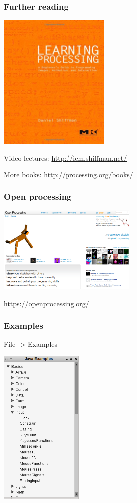 \documentclass[ignorenonframetext,]{beamer}
\begin{document}
\begin{frame}[fragile]\frametitle{Further reading}

\includegraphics[width=0.4\textwidth]{../images/learningprocessing.jpg}

Video lectures: \url{http://icm.shiffman.net/}

More books: \url{http://processing.org/books/}

\end{frame}

\begin{frame}\frametitle{Open processing}

\begin{center}
\includegraphics[width=0.5\textwidth]{../images/openprocessing.png}

\url{https://openprocessing.org/}
\end{center}

\end{frame}

\begin{frame}\frametitle{Examples}

File -\textgreater{} Examples

\begin{center}
\includegraphics[width=0.3\textwidth]{../images/examples.png}
\end{center}

\end{frame}
\end{document}
